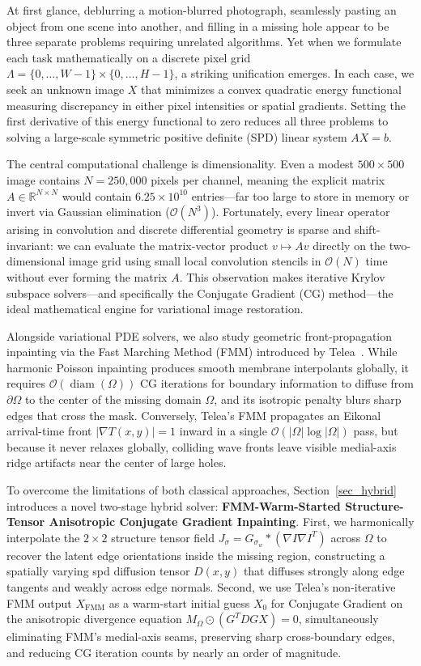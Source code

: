 \documentclass{amsart}
\begin{document}
At first glance, deblurring a motion-blurred photograph, seamlessly pasting an object from one scene into another, and filling in a missing hole appear to be three separate problems requiring unrelated algorithms. Yet when we formulate each task mathematically on a discrete pixel grid $\Lambda = \{0, \dots, W-1\} \times \{0, \dots, H-1\}$, a striking unification emerges. In each case, we seek an unknown image $X$ that minimizes a convex quadratic energy functional measuring discrepancy in either pixel intensities or spatial gradients. Setting the first derivative of this energy functional to zero reduces all three problems to solving a large-scale symmetric positive definite (SPD) linear system $A X = b$.

The central computational challenge is dimensionality. Even a modest $500 \times 500$ image contains $N = 250{,}000$ pixels per channel, meaning the explicit matrix $A \in \mathbb{R}^{N \times N}$ would contain $6.25 \times 10^{10}$ entries---far too large to store in memory or invert via Gaussian elimination ($\mathcal{O}(N^3)$). Fortunately, every linear operator arising in convolution and discrete differential geometry is sparse and shift-invariant: we can evaluate the matrix-vector product $v \mapsto A v$ directly on the two-dimensional image grid using small local convolution stencils in $\mathcal{O}(N)$ time without ever forming the matrix $A$. This observation makes iterative Krylov subspace solvers---and specifically the Conjugate Gradient (CG) method---the ideal mathematical engine for variational image restoration.

Alongside variational PDE solvers, we also study geometric front-propagation inpainting via the Fast Marching Method (FMM) introduced by Telea~\cite{telea2004}. While harmonic Poisson inpainting produces smooth membrane interpolants globally, it requires $\mathcal{O}(\operatorname{diam}(\Omega))$ CG iterations for boundary information to diffuse from $\partial\Omega$ to the center of the missing domain $\Omega$, and its isotropic penalty blurs sharp edges that cross the mask. Conversely, Telea's FMM propagates an Eikonal arrival-time front $|\nabla T(x,y)| = 1$ inward in a single $\mathcal{O}(|\Omega|\log|\Omega|)$ pass, but because it never relaxes globally, colliding wave fronts leave visible medial-axis ridge artifacts near the center of large holes.

To overcome the limitations of both classical approaches, Section~\ref{sec_hybrid} introduces a novel two-stage hybrid solver: \textbf{FMM-Warm-Started Structure-Tensor Anisotropic Conjugate Gradient Inpainting}. First, we harmonically interpolate the $2 \times 2$ structure tensor field $J_\sigma = G_{\sigma_w} * (\nabla I \nabla I^T)$ across $\Omega$ to recover the latent edge orientations inside the missing region, constructing a spatially varying spd diffusion tensor $D(x,y)$ that diffuses strongly along edge tangents and weakly across edge normals. Second, we use Telea's non-iterative FMM output $X_{\text{FMM}}$ as a warm-start initial guess $X_0$ for Conjugate Gradient on the anisotropic divergence equation $M_\Omega \odot (G^T D G X) = 0$, simultaneously eliminating FMM's medial-axis seams, preserving sharp cross-boundary edges, and reducing CG iteration counts by nearly an order of magnitude.
\end{document}
